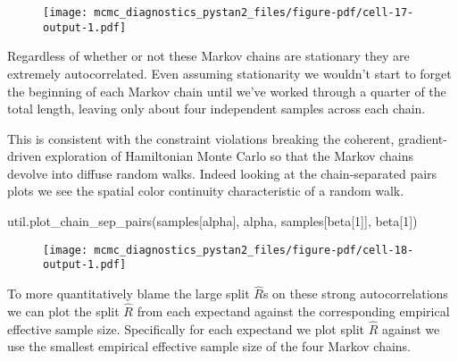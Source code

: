 \documentclass[
  letterpaper,
  DIV=11,
  numbers=noendperiod]{scrartcl}
\newenvironment{Shaded}{\begin{snugshade}}{\end{snugshade}}
\newcommand{\NormalTok}[1]{\textcolor[rgb]{0.00,0.23,0.31}{#1}}
\newcommand{\StringTok}[1]{\textcolor[rgb]{0.13,0.47,0.30}{#1}}
\begin{document}
\begin{figure}[H]

{\centering \texttt{[image: mcmc\_diagnostics\_pystan2\_files/figure-pdf/cell-17-output-1.pdf]}

}

\end{figure}

Regardless of whether or not these Markov chains are stationary they are
extremely autocorrelated. Even assuming stationarity we wouldn't start
to forget the beginning of each Markov chain until we've worked through
a quarter of the total length, leaving only about four independent
samples across each chain.

This is consistent with the constraint violations breaking the coherent,
gradient-driven exploration of Hamiltonian Monte Carlo so that the
Markov chains devolve into diffuse random walks. Indeed looking at the
chain-separated pairs plots we see the spatial color continuity
characteristic of a random walk.

\begin{Shaded}
\begin{Highlighting}[]
\NormalTok{util.plot\_chain\_sep\_pairs(samples[}\StringTok{\textquotesingle{}alpha\textquotesingle{}}\NormalTok{], }\StringTok{\textquotesingle{}alpha\textquotesingle{}}\NormalTok{, }
\NormalTok{                          samples[}\StringTok{\textquotesingle{}beta[1]\textquotesingle{}}\NormalTok{], }\StringTok{\textquotesingle{}beta[1]\textquotesingle{}}\NormalTok{)}
\end{Highlighting}
\end{Shaded}

\begin{figure}[H]

{\centering \texttt{[image: mcmc\_diagnostics\_pystan2\_files/figure-pdf/cell-18-output-1.pdf]}

}

\end{figure}

To more quantitatively blame the large split \(\hat{R}\)s on these
strong autocorrelations we can plot the split \(\hat{R}\) from each
expectand against the corresponding empirical effective sample size.
Specifically for each expectand we plot split \(\hat{R}\) against we use
the smallest empirical effective sample size of the four Markov chains.
\end{document}
